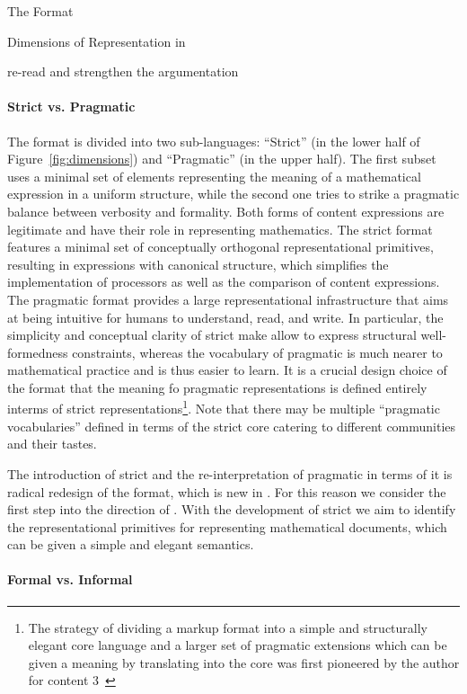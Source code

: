 \begin{omgroup}[creators=miko,id=spec-intro]{The {\omdoc} Format}
\begin{omgroup}[id=syntax-semantics]{Dimensions of Representation in {\omdoc}}
\begin{newpart}{re-read and strengthen the argumentation}
\paragraph{Strict vs. Pragmatic} The {\omdoc} format is divided into two sub-languages:
``Strict'' {\omdoc} (in the lower half of Figure~\ref{fig:dimensions}) and ``Pragmatic''
{\omdoc} (in the upper half). The first subset uses a minimal set of elements representing the meaning of a
mathematical expression in a uniform structure, while the second one tries to strike a
pragmatic balance between verbosity and formality. Both forms of content expressions are
legitimate and have their role in representing mathematics. The strict {\omdoc} format
features a minimal set of conceptually orthogonal representational primitives, resulting
in expressions with canonical structure, which simplifies the implementation of {\omdoc}
processors as well as the comparison of content expressions.  The pragmatic {\omdoc}
format provides a large representational infrastructure that aims at being intuitive for
humans to understand, read, and write. In particular, the simplicity and conceptual clarity of strict {\omdoc} make allow
to express structural well-formedness constraints, whereas the vocabulary of pragmatic
\omdoc is much nearer to mathematical practice and is thus easier to learn. It is a
crucial design choice of the \omdoc format that the meaning fo pragmatic representations
is defined entirely interms of strict representations\footnote{The strategy of dividing a
  markup format into a simple and structurally elegant core language and a larger set of
  pragmatic extensions which can be given a meaning by translating into the core was first
  pioneered by the author for content {\mathml}3~\cite{CarlisleEd:MathML08}}. Note that
there may be multiple ``pragmatic vocabularies'' defined in terms of the strict core
catering to different communities and their tastes.

The introduction of strict {\omdoc} and the re-interpretation of pragmatic {\omdoc} in
terms of it is radical redesign of the {\omdoc} format, which is new in {}.
For this reason we consider {} the first step into the direction of
{}. With the development of strict {\omdoc} we aim to identify the
representational primitives for representing mathematical documents, which can be given a
simple and elegant semantics.

\paragraph{Formal vs. Informal} 


\end{newpart}
\end{omgroup}
\end{omgroup}
